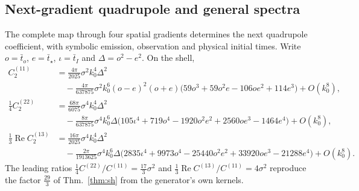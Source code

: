 \documentclass[11pt]{article}
\theoremstyle{definition}
\theoremstyle{remark}
\begin{document}
\subsection{Next-gradient quadrupole and general spectra}\label{sec:next-gradient}
The complete map through four spatial gradients determines the next quadrupole coefficient,
with symbolic emission, observation and physical initial times. Write $o=\bar t_o$,
$e=\bar t_\star$, $\iota=\bar t_I$ and $\Delta=o^2-e^2$. On the shell,
\begin{align*}
C^{(11)}_2&=\frac{4\pi}{2025}\sigma^2k_0^4\Delta^2\\
&\quad-\frac{4\pi}{637875}\sigma^2k_0^6(o-e)^2(o+e)
\big(59o^3+59o^2e-106oe^2+114e^3\big)+O(k_0^8),\\
\tfrac14C^{(22)}_2&=\frac{68\pi}{6075}\sigma^4k_0^4\Delta^2\\
&\quad-\frac{8\pi}{637875}\sigma^4k_0^6\Delta
\big(105\iota^4+719o^4-1920o^2e^2+2560oe^3-1464e^4\big)+O(k_0^8),\\
\tfrac13\operatorname{Re}C^{(13)}_2&=\frac{16\pi}{2025}\sigma^4k_0^4\Delta^2\\
&\quad-\frac{2\pi}{1913625}\sigma^4k_0^6\Delta
\big(2835\iota^4+9973o^4-25440o^2e^2+33920oe^3-21288e^4\big)+O(k_0^8).
\end{align*}
The leading ratios $\frac14C^{(22)}/C^{(11)}=\frac{17}3\sigma^2$ and
$\frac13\operatorname{Re}C^{(13)}/C^{(11)}=4\sigma^2$ reproduce the factor $\frac{29}3$ of
Thm.~\ref{thm:sh} from the generator's own kernels.
\end{document}
